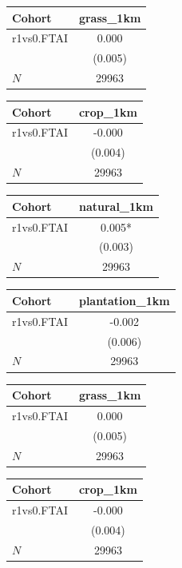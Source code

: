 {
\def\sym#1{\ifmmode^{#1}\else\(^{#1}\)\fi}
\begin{tabular}{l*{1}{c}}
\toprule
Cohort    &grass\_1km   \\
\midrule
r1vs0.FTAI&    0.000   \\
          &  (0.005)   \\
\midrule
\(N\)     &    29963   \\
\bottomrule
\end{tabular}
}
{
\def\sym#1{\ifmmode^{#1}\else\(^{#1}\)\fi}
\begin{tabular}{l*{1}{c}}
\toprule
Cohort    & crop\_1km   \\
\midrule
r1vs0.FTAI&   -0.000   \\
          &  (0.004)   \\
\midrule
\(N\)     &    29963   \\
\bottomrule
\end{tabular}
}
{
\def\sym#1{\ifmmode^{#1}\else\(^{#1}\)\fi}
\begin{tabular}{l*{1}{c}}
\toprule
Cohort    &natural\_1km   \\
\midrule
r1vs0.FTAI&    0.005*  \\
          &  (0.003)   \\
\midrule
\(N\)     &    29963   \\
\bottomrule
\end{tabular}
}
{
\def\sym#1{\ifmmode^{#1}\else\(^{#1}\)\fi}
\begin{tabular}{l*{1}{c}}
\toprule
Cohort    &plantation\_1km   \\
\midrule
r1vs0.FTAI&   -0.002   \\
          &  (0.006)   \\
\midrule
\(N\)     &    29963   \\
\bottomrule
\end{tabular}
}
{
\def\sym#1{\ifmmode^{#1}\else\(^{#1}\)\fi}
\begin{tabular}{l*{1}{c}}
\toprule
Cohort    &grass\_1km   \\
\midrule
r1vs0.FTAI&    0.000   \\
          &  (0.005)   \\
\midrule
\(N\)     &    29963   \\
\bottomrule
\end{tabular}
}
{
\def\sym#1{\ifmmode^{#1}\else\(^{#1}\)\fi}
\begin{tabular}{l*{1}{c}}
\toprule
Cohort    & crop\_1km   \\
\midrule
r1vs0.FTAI&   -0.000   \\
          &  (0.004)   \\
\midrule
\(N\)     &    29963   \\
\bottomrule
\end{tabular}
}

